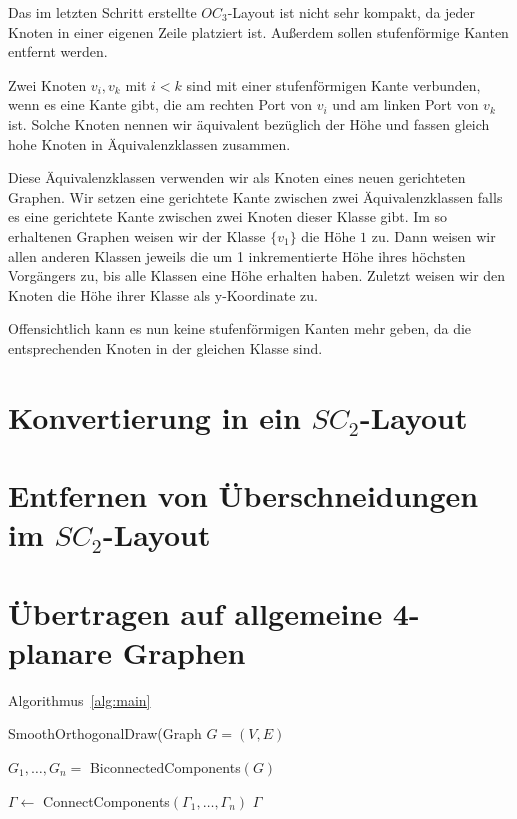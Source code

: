 \documentclass[a4paper]{scrreprt}
\theoremstyle{definition}
\begin{document}
Das im letzten Schritt erstellte $OC_3$-Layout ist nicht sehr kompakt, da jeder Knoten in einer eigenen Zeile platziert ist. Außerdem sollen stufenförmige Kanten entfernt werden.

Zwei Knoten $v_i, v_k$ mit $i < k$ sind mit einer stufenförmigen Kante verbunden, wenn es eine Kante gibt, die am rechten Port von $v_i$ und am linken Port von $v_k$ ist. Solche Knoten nennen wir äquivalent bezüglich der Höhe und fassen gleich hohe Knoten in Äquivalenzklassen zusammen.

Diese Äquivalenzklassen verwenden wir als Knoten eines neuen gerichteten Graphen. Wir setzen eine gerichtete Kante zwischen zwei Äquivalenzklassen falls es eine gerichtete Kante zwischen zwei Knoten dieser Klasse gibt. Im so erhaltenen Graphen weisen wir der Klasse $\{v_1\}$ die Höhe $1$ zu. Dann weisen wir allen anderen Klassen jeweils die um 1 inkrementierte Höhe ihres höchsten Vorgängers zu, bis alle Klassen eine Höhe erhalten haben. Zuletzt weisen wir den Knoten die Höhe ihrer Klasse als y-Koordinate zu.

Offensichtlich kann es nun keine stufenförmigen Kanten mehr geben, da die entsprechenden Knoten in der gleichen Klasse sind.

\section{Konvertierung in ein $SC_2$-Layout}



\section{Entfernen von Überschneidungen im $SC_2$-Layout}



\section{Übertragen auf allgemeine 4-planare Graphen}

Algorithmus~\ref{alg:main}

\begin{algorithm}[ht]
  \caption{SmoothOrthogonalDraw(Graph $G = (V,E)$}
  \label{alg:main}
  
  $G_1, \dots, G_n =$ BiconnectedComponents$(G)$ \;
  
  $\Gamma \leftarrow$ ConnectComponents$(\Gamma_1, \dots, \Gamma_n)$ \;
  \Return $\Gamma$
\end{algorithm}
\end{document}
